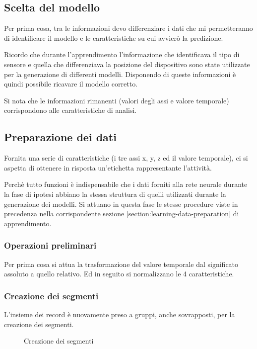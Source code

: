 \subsection{Scelta del modello}
Per prima cosa, tra le informazioni devo differenziare i dati che mi permetteranno di identificare il modello e le caratteristiche 
su cui avvierò la predizione.

Ricordo che durante l'apprendimento l'informazione che identificava il tipo di sensore e quella che differenziava 
la posizione del dispositivo sono state utilizzate per la generazione di differenti modelli.
Disponendo di queste informazioni è quindi possibile ricavare il modello corretto.

Si nota che le informazioni rimanenti (valori degli assi e valore temporale) corrispondono alle caratteristiche di analisi.


\subsection{Preparazione dei dati}
Fornita una serie di caratteristiche (i tre assi x, y, z ed il valore temporale), ci si aspetta di ottenere 
in risposta un'etichetta rappresentante l'attività.

\vspace{5mm} %

Perchè tutto funzioni è indispensabile che i dati forniti alla rete neurale durante la fase di ipotesi 
abbiano la stessa struttura di quelli utilizzati durante la generazione dei modelli.
Si attuano in questa fase le stesse procedure viste in precedenza nella corrispondente sezione 
\ref{section:learning-data-preparation} di apprendimento.

\subsubsection{Operazioni preliminari}
Per prima cosa si attua la trasformazione del valore temporale dal significato assoluto a quello relativo.
Ed in seguito si normalizzano le 4 caratteristiche.


\subsubsection{Creazione dei segmenti}
L'insieme dei record è nuovamente preso a gruppi, anche sovrapposti, per la creazione dei segmenti.

\begin{figure}[H]
    \centering
    
    \caption{Creazione dei segmenti}
    \label{fig:create_segments}
\end{figure}

